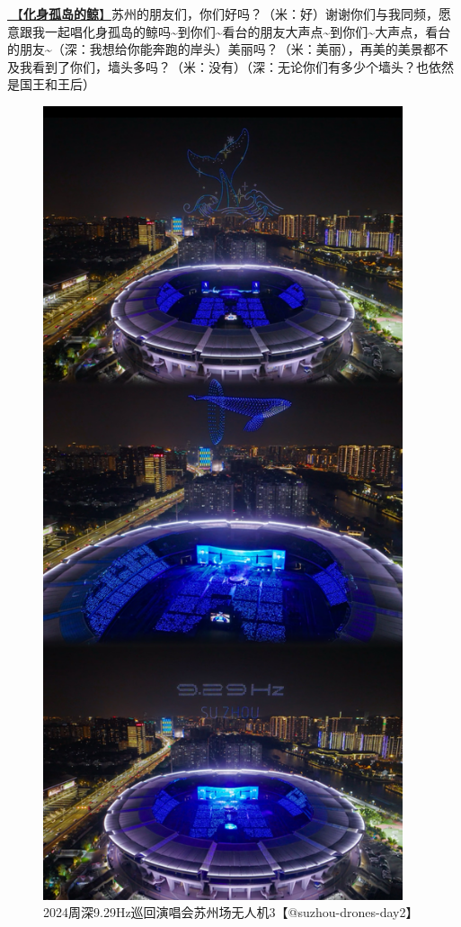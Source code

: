 \documentclass[]{ctexbook}
\begin{document}
\hyperref[hua-shen-gu-dao-de-jing]{🎵【\textbf{化身孤岛的鲸}】}苏州的朋友们，你们好吗？（米：好）谢谢你们与我同频，愿意跟我一起唱化身孤岛的鲸吗\textasciitilde 到你们\textasciitilde 看台的朋友大声点\textasciitilde 到你们\textasciitilde 大声点，看台的朋友\textasciitilde（深：我想给你能奔跑的岸头）美丽吗？（米：美丽），再美的美景都不及我看到了你们，墙头多吗？（米：没有）（深：无论你们有多少个墙头？也依然是国王和王后）

\begin{figure}

{\centering \includegraphics[width=300pt]{img/suzhou20241110/001} 

}

\caption{2024周深9.29Hz巡回演唱会苏州场无人机3【@suzhou-drones-day2】}\label{fig:unnamed-chunk-120}
\end{figure}
\end{document}
